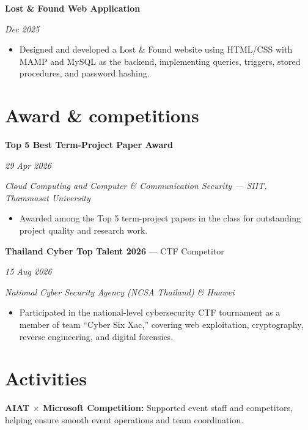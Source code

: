 \documentclass[11pt,a4paper]{article}
\newcommand{\entry}[2]{%
  \begin{minipage}[t]{0.85\textwidth}\raggedright #1\end{minipage}%
  \hfill%
  \begin{minipage}[t]{0.15\textwidth}\raggedleft\textit{#2}\end{minipage}%
  \par\vspace{1pt}%
}
\newenvironment{details}
{\begin{itemize}[leftmargin=0.5em,topsep=2pt,itemsep=0pt,parsep=0pt]}
{\end{itemize}\vspace{-3pt}}
\newcommand{\venue}[1]{\textit{#1}\par}
\begin{document}
\entry{\textbf{Lost \& Found Web Application}}{Dec 2025}
\begin{details}
\item Designed and developed a Lost \& Found website using HTML/CSS with MAMP and MySQL as the backend, implementing queries, triggers, stored procedures, and password hashing.
\end{details}

\section{Award \& competitions}

\entry{\textbf{Top 5 Best Term-Project Paper Award}}{29 Apr 2026}
\venue{Cloud Computing and Computer \& Communication Security --- SIIT, Thammasat University}
\begin{details}
  \item Awarded among the Top 5 term-project papers in the class for outstanding project quality and research work.
\end{details}

\entry{\textbf{Thailand Cyber Top Talent 2026} --- CTF Competitor}{15 Aug 2026}
\venue{National Cyber Security Agency (NCSA Thailand) \& Huawei}
\begin{details}
  \item Participated in the national-level cybersecurity CTF tournament as a member of
        team ``Cyber Six Xac,'' covering web exploitation, cryptography, reverse engineering,
        and digital forensics.
\end{details}

\section{Activities}


\entry{\textbf{AIAT $\times$ Microsoft Competition:} Supported event staff and competitors, helping ensure smooth event operations and team coordination.}{}
\end{document}
